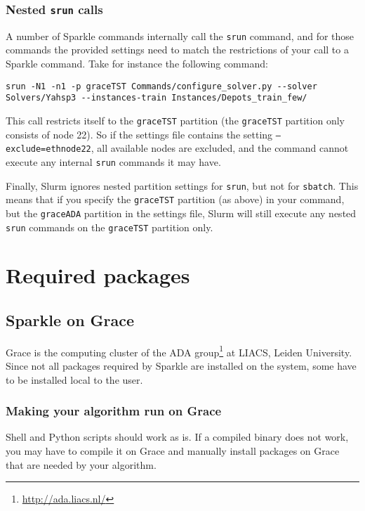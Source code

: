 \documentclass{article}
\begin{document}
\subsubsection{Nested \texttt{srun} calls}
A number of Sparkle commands internally call the \texttt{srun} command, and for those commands the provided settings need to match the restrictions of your call to a Sparkle command. Take for instance the following command:

\begin{lstlisting}[breaklines]
srun -N1 -n1 -p graceTST Commands/configure_solver.py --solver Solvers/Yahsp3 --instances-train Instances/Depots_train_few/
\end{lstlisting}

This call restricts itself to the \texttt{graceTST} partition (the \texttt{graceTST} partition only consists of node 22). So if the settings file contains the setting \texttt{--exclude=ethnode22}, all available nodes are excluded, and the command cannot execute any internal \texttt{srun} commands it may have.

Finally, Slurm ignores nested partition settings for \texttt{srun}, but not for \texttt{sbatch}. This means that if you specify the \texttt{graceTST} partition (as above) in your command, but the \texttt{graceADA} partition in the settings file, Slurm will still execute any nested \texttt{srun} commands on the \texttt{graceTST} partition only.

\section{Required packages}

\subsection{Sparkle on Grace}

Grace is the computing cluster of the ADA group\footnote{\url{http://ada.liacs.nl/}} at LIACS, Leiden University. Since not all packages required by Sparkle are installed on the system, some have to be installed local to the user.

\subsubsection{Making your algorithm run on Grace}
\label{solver_grace}

Shell and Python scripts should work as is. If a compiled binary does not work, you may have to compile it on Grace and manually install packages on Grace that are needed by your algorithm.
\end{document}
